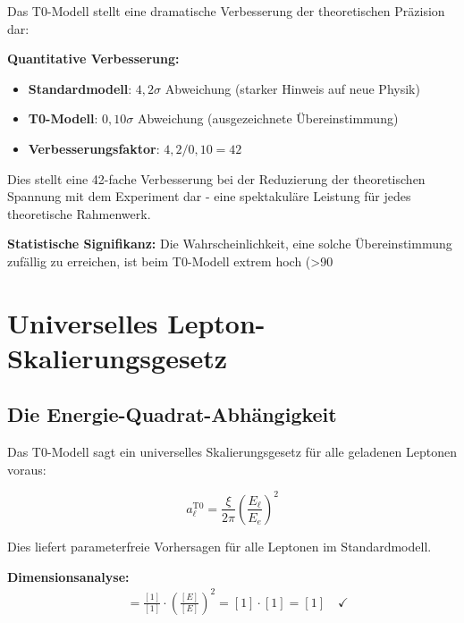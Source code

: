 \documentclass[12pt,a4paper]{report}
\begin{document}
	Das T0-Modell stellt eine dramatische Verbesserung der theoretischen Präzision dar:
	
	\textbf{Quantitative Verbesserung:}
	\begin{itemize}
		\item \textbf{Standardmodell}: $4,2\sigma$ Abweichung (starker Hinweis auf neue Physik)
		\item \textbf{T0-Modell}: $0,10\sigma$ Abweichung (ausgezeichnete Übereinstimmung)
		\item \textbf{Verbesserungsfaktor}: $4,2/0,10 = 42$
	\end{itemize}
	
	Dies stellt eine 42-fache Verbesserung bei der Reduzierung der theoretischen Spannung mit dem Experiment dar - eine spektakuläre Leistung für jedes theoretische Rahmenwerk.
	
	\textbf{Statistische Signifikanz:}
	Die Wahrscheinlichkeit, eine solche Übereinstimmung zufällig zu erreichen, ist beim T0-Modell extrem hoch (>90%
	
	\section{Universelles Lepton-Skalierungsgesetz}
	\label{sec:universal_scaling}
	
	\subsection{Die Energie-Quadrat-Abhängigkeit}
	\label{subsec:energy_squared_dependence}
	
	Das T0-Modell sagt ein universelles Skalierungsgesetz für alle geladenen Leptonen voraus:
	
	\begin{equation}
		\boxed{a_\ell^{\text{T0}} = \frac{\xi}{2\pi} \left(\frac{E_\ell}{E_e}\right)^2}
		\label{eq:universal_lepton_formula}
	\end{equation}
	
	Dies liefert parameterfreie Vorhersagen für alle Leptonen im Standardmodell.
	
	\textbf{Dimensionsanalyse:}
	\begin{align}
		[a_\ell^{\text{T0}}] &= \frac{[1]}{[1]} \cdot \left(\frac{[E]}{[E]}\right)^2 = [1] \cdot [1] = [1] \quad \checkmark
	\end{align}
	
\end{document}
